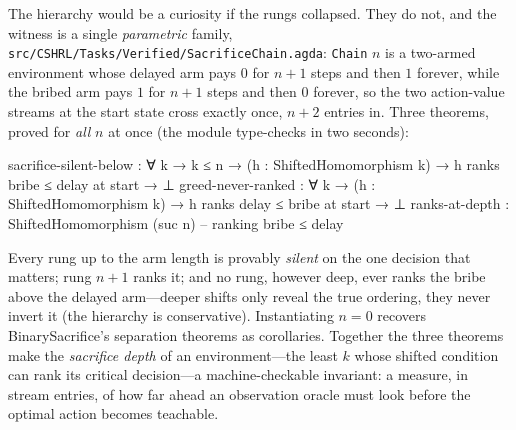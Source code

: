 \documentclass[9pt,a4paper]{article}
\newcommand{\fpath}[1]{\nolinkurl{#1}}
\theoremstyle{plain}
\theoremstyle{definition}
\theoremstyle{remark}
\begin{document}
The hierarchy would be a curiosity if the rungs collapsed.  They do not, and the witness is a single \emph{parametric} family, \fpath{src/CSHRL/Tasks/Verified/SacrificeChain.agda}: \texttt{Chain} $n$ is a two-armed environment whose delayed arm pays $0$ for $n{+}1$ steps and then $1$ forever, while the bribed arm pays $1$ for $n{+}1$ steps and then $0$ forever, so the two action-value streams at the start state cross exactly once, $n{+}2$ entries in.  Three theorems, proved for \emph{all} $n$ at once (the module type-checks in two seconds):
\begin{spec}
sacrifice-silent-below : ∀ k → k ≤ n → (h : ShiftedHomomorphism k) →
                         h ranks bribe ≤ delay at start → ⊥
greed-never-ranked     : ∀ k → (h : ShiftedHomomorphism k) →
                         h ranks delay ≤ bribe at start → ⊥
ranks-at-depth         : ShiftedHomomorphism (suc n)   -- ranking bribe ≤ delay
\end{spec}
Every rung up to the arm length is provably \emph{silent} on the one decision that matters; rung $n{+}1$ ranks it; and no rung, however deep, ever ranks the bribe above the delayed arm---deeper shifts only reveal the true ordering, they never invert it (the hierarchy is conservative).  Instantiating $n = 0$ recovers BinarySacrifice's separation theorems as corollaries.  Together the three theorems make the \emph{sacrifice depth} of an environment---the least $k$ whose shifted condition can rank its critical decision---a machine-checkable invariant: a measure, in stream entries, of how far ahead an observation oracle must look before the optimal action becomes teachable.
\end{document}
